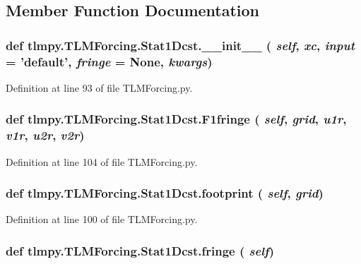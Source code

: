 \subsection{Member Function Documentation}
\hypertarget{classtlmpy_1_1TLMForcing_1_1Stat1Dcst_a032febe84f65c97d60c981124dfa52f6}{
\subsubsection[{\_\-\_\-init\_\-\_\-}]{\setlength{\rightskip}{0pt plus 5cm}def tlmpy.TLMForcing.Stat1Dcst.\_\-\_\-init\_\-\_\- ( {\em self}, \/   {\em xc}, \/   {\em input} = {\ttfamily 'default'}, \/   {\em fringe} = {\ttfamily None}, \/   {\em kwargs})}}
\label{classtlmpy_1_1TLMForcing_1_1Stat1Dcst_a032febe84f65c97d60c981124dfa52f6}


Definition at line 93 of file TLMForcing.py.\hypertarget{classtlmpy_1_1TLMForcing_1_1Stat1Dcst_afffb7cc6cd60170d67930b005f7ba602}{
\subsubsection[{F1fringe}]{\setlength{\rightskip}{0pt plus 5cm}def tlmpy.TLMForcing.Stat1Dcst.F1fringe ( {\em self}, \/   {\em grid}, \/   {\em u1r}, \/   {\em v1r}, \/   {\em u2r}, \/   {\em v2r})}}
\label{classtlmpy_1_1TLMForcing_1_1Stat1Dcst_afffb7cc6cd60170d67930b005f7ba602}


Definition at line 104 of file TLMForcing.py.\hypertarget{classtlmpy_1_1TLMForcing_1_1Stat1Dcst_afa6db3dc9a2cf213ba69b62e57c8a388}{
\subsubsection[{footprint}]{\setlength{\rightskip}{0pt plus 5cm}def tlmpy.TLMForcing.Stat1Dcst.footprint ( {\em self}, \/   {\em grid})}}
\label{classtlmpy_1_1TLMForcing_1_1Stat1Dcst_afa6db3dc9a2cf213ba69b62e57c8a388}


Definition at line 100 of file TLMForcing.py.\hypertarget{classtlmpy_1_1TLMForcing_1_1Stat1Dcst_a32b727af63b756a26bfededd9c9cdee5}{
\subsubsection[{fringe}]{\setlength{\rightskip}{0pt plus 5cm}def tlmpy.TLMForcing.Stat1Dcst.fringe ( {\em self})}}
\label{classtlmpy_1_1TLMForcing_1_1Stat1Dcst_a32b727af63b756a26bfededd9c9cdee5}


